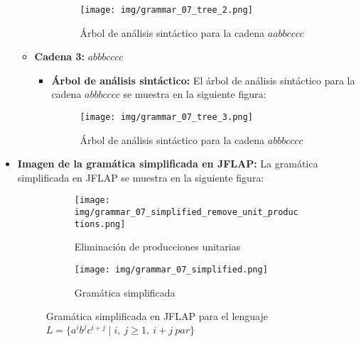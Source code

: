 \documentclass[11pt]{report}
\begin{document}
\begin{itemize}
\begin{itemize}
\begin{itemize}
      \begin{figure}[H]
        \centering
        \texttt{[image: img/grammar\_07\_tree\_2.png]}
        \caption{Árbol de análisis sintáctico para la cadena $aabbcccc$}
        \label{fig:arbol20}
      \end{figure}
    \end{itemize}
    \item \textbf{Cadena 3:} $abbbcccc$
    \begin{itemize}
      \item \textbf{Árbol de análisis sintáctico:} El árbol de análisis sintáctico para la cadena $abbbcccc$ se muestra en la siguiente figura:
      \begin{figure}[H]
        \centering
        \texttt{[image: img/grammar\_07\_tree\_3.png]}
        \caption{Árbol de análisis sintáctico para la cadena $abbbcccc$}
        \label{fig:arbol21}
      \end{figure}
    \end{itemize}
  \end{itemize}
  \item \textbf{Imagen de la gramática simplificada en JFLAP:} La gramática simplificada en JFLAP se muestra en la siguiente figura:
  \begin{figure}[H]
    \begin{subfigure}{0.5\textwidth}
      \centering
      \texttt{[image: img/grammar\_07\_simplified\_remove\_unit\_productions.png]}
      \caption{Eliminación de producciones unitarias}
    \end{subfigure}%
    \begin{subfigure}{0.5\textwidth}
      \centering
      \texttt{[image: img/grammar\_07\_simplified.png]}
      \caption{Gramática simplificada}
    \end{subfigure}
    \caption{Gramática simplificada en JFLAP para el lenguaje $L = \{a^i b^j c^{i+j} \mid i, \ j \geq 1, \ i + j \ par\}$}
  \end{figure}
\end{itemize}
\end{document}
